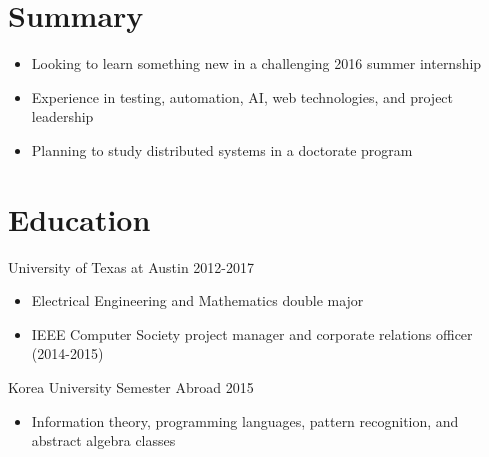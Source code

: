 \documentclass[line,margin]{res}
\begin{document}
    \address{10336 Kilmarnock Drive, Austin, TX 78726}
    \address{(512) 917-8236 |
    \href{mailto:jdong42@gmail.com}{jdong42@gmail.com}}

\begin{resume}

\vspace{-8pt}
\section{Summary}
\vspace{22pt}
    \begin{itemize} \itemsep -2pt %
    \item Looking to learn something new in a challenging 2016 summer internship
    \item Experience in testing, automation, AI, web technologies, and project leadership 
    \item Planning to study distributed systems in a doctorate program
    \end{itemize}

   
\vspace{-8pt}
\section{Education} 
\vspace{12pt}
University of Texas at Austin \hfill 2012-2017 \\
\vspace{-12pt}
    \begin{itemize} \itemsep -2pt %
    \item Electrical Engineering and Mathematics double major
    \item IEEE Computer Society project manager and corporate relations officer (2014-2015)
    \end{itemize}
 
\vspace{-6pt}
Korea University Semester Abroad \hfill 2015 \\
\vspace{-12pt}
    \begin{itemize} \itemsep -2pt %
    \item Information theory, programming languages, pattern recognition, and abstract algebra classes
    \end{itemize}
  


\end{resume}
\end{document}
